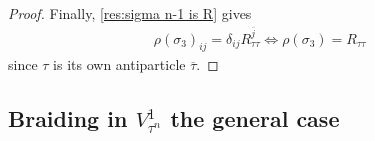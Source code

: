 \documentclass[a4paper,10pt,oneside]{book}
\makeatletter
\theoremstyle{plain}
\theoremstyle{definition}
\theoremstyle{remark}
\newcounter{mycounter}
\newcommand{\fs}[3][]{
  \begin{tikzpicture}[scale=0.3,font=\footnotesize,anchor=mid,baseline={([yshift=-.5ex]current bounding box.center)}]
    \def\height{1.5}
    \def\offset{0.5}
    \ifthenelse{\equal{#1}{}}{\def\height{1}}{} %
    \setcounter{mycounter}{0}
    \@for\el:=#2\do{
      \ifthenelse{\equal{#1}{\value{mycounter}}}{
        \braid at (\value{mycounter},\height) s_1^{-1};
        \stepcounter{mycounter}
      }{
        \stepcounter{mycounter}
        \ifthenelse{\equal{#1}{\value{mycounter}}}{
        }{
          \draw (\value{mycounter}, \height) to (\value{mycounter}, 0);
        }
      }
      \node at (\value{mycounter}, \height+\offset) {$\el$};
    }
    \draw (0, 0) to (\value{mycounter}+1, 0);
    \setcounter{mycounter}{0}
    \@for\el:=#3\do{
      \node at (\value{mycounter}+0.5, -0.6) {$\el$};
      \stepcounter{mycounter}
    }
  \end{tikzpicture}
}
\makeatother
\begin{document}
{\begin{proof}
  Finally, \cref{res:sigma n-1 is R} gives
  \begin{align*}
    \rho(\sigma_3)_{ij} = \delta_{ij} R_{\tau\tau}^{\overline{j}}
    \iff
    \rho(\sigma_3) = R_{\tau\tau}
  \end{align*}
  since $\tau$ is its own antiparticle $\overline{\tau}$.
\end{proof}




\subsection{Braiding in $V_{\tau^n}^1$ the general case}

}
\end{document}
